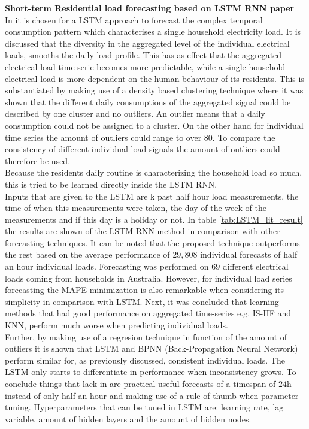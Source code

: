 \textbf{Short-term Residential load forecasting based on LSTM RNN paper}\\
In \cite{Kong2019} it is chosen for a LSTM approach to forecast the complex temporal consumption pattern which characterises a single household electricity load. It is discussed that the diversity in the aggregated level of the individual electrical loads, smooths the daily load profile. This has as effect that the aggregated electrical load time-serie becomes more predictable, while a single household electrical load is more dependent on the human behaviour of its residents. This is substantiated by making use of a density based clustering technique where it was shown that the different daily consumptions of the aggregated signal could be described by one cluster and no outliers. An outlier means that a daily consumption could not be assigned to a cluster. On the other hand for individual time series the amount of outliers could range to over $ 80 $. To compare the consistency of different individual load signals the amount of outliers could therefore be used.\\
Because the residents daily routine is characterizing the household load so much, this is tried to be learned directly inside the LSTM RNN.\\
Inputs that are given to the LSTM are k past half hour load measurements, the time of when this measurements were taken, the day of the week of the measurements and if this day is a holiday or not. In table \ref{tab:LSTM_lit_result} the results are shown of the LSTM RNN method in comparison with other forecasting techniques. It can be noted that the proposed technique outperforms the rest based on the average performance of $ 29,808 $ individual forecasts of half an hour individual loads. Forecasting was performed on $ 69 $ different electrical loads coming from households in Australia.  However, for individual load series forecasting the MAPE minimization is also remarkable when considering its simplicity in comparison with LSTM. Next, it was concluded that learning methods that had good performance on aggregated time-series e.g. IS-HF and KNN, perform much worse when predicting individual loads. \\
Further, by making use of a regresion technique in function of the amount of outliers it is shown that LSTM and BPNN (Back-Propagation Neural Network) perform similar for, as previously discussed, consistent individual loads. The LSTM only starts to differentiate in performance when inconsistency grows. To conclude things that lack in \cite{Kong2019} are practical useful forecasts of a timespan of $ 24 $h instead of only half an hour and making use of a rule of thumb when parameter tuning. Hyperparameters that can be tuned in LSTM are: learning rate, lag variable, amount of hidden layers and the amount of hidden nodes.\\

